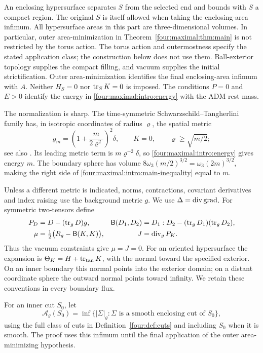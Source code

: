 An enclosing hypersurface separates \(S\) from the selected end and bounds
with \(S\) a compact region. The original \(S\) is itself allowed when
taking the enclosing-area infimum. All hypersurface areas in this part
are three-dimensional volumes. In particular, outer area-minimization in
Theorem~\ref{four:maximal:thm:main} is not restricted by the torus action.
The torus action and outermostness specify the stated application class;
the construction below does not use them.  Ball-exterior topology supplies
the compact filling, and vacuum supplies the initial strictification.
Outer area-minimization identifies the final enclosing-area infimum with
\(A\).  Neither \(H_S=0\) nor \(\operatorname{tr}_SK=0\) is imposed.  The conditions
\(P=0\) and \(E>0\) identify the energy in
\eqref{four:maximal:intro:energy} with the ADM rest mass.

The normalization is sharp. The time-symmetric Schwarzschild--Tangherlini
family \cite{Tangherlini1963} has, in isotropic coordinates of radius
\(\varrho\), the spatial metric
\[
 g_m=\left(1+\frac{m}{2\varrho^2}\right)^2\delta,
 \qquad K=0,
 \qquad \varrho\ge\sqrt{m/2};
\]
see also \cite[p.~83]{BrayLee2009}. Its leading metric term is
\(m\varrho^{-2}\delta\), so \eqref{four:maximal:intro:energy} gives energy \(m\).
The boundary sphere has volume
\(8\omega_3(m/2)^{3/2}=\omega_3(2m)^{3/2}\), making the right side of
\eqref{four:maximal:intro:main-inequality} equal to \(m\).


Unless a different metric is indicated, norms, contractions, covariant
derivatives and index raising use the background metric \(g\). We use
\(\Delta=\operatorname{div}\operatorname{grad}\). For symmetric two-tensors define
\begin{align}
 P_D&=D-(\operatorname{tr}_gD)g, &
 \mathsf{B}(D_1,D_2)&=D_1:D_2-(\operatorname{tr}_gD_1)(\operatorname{tr}_gD_2),\label{four:maximal:intro:bilinear}\\
 \mu&=\tfrac12\bigl(R_g-\mathsf{B}(K,K)\bigr), &
 J&=\operatorname{div}_gP_K.\label{four:maximal:intro:densities}
\end{align}
Thus the vacuum constraints give \(\mu=J=0\).
For an oriented hypersurface the expansion is
\(\Theta_K=H+\operatorname{tr}_{\mathrm{tan}}K\), with the normal toward the
specified exterior. On an inner boundary this normal points into the
exterior domain; on a distant coordinate sphere the outward normal points
toward infinity. We retain these conventions in every boundary flux.

For an inner cut \(S_0\), let
\[
 \mathcal A_g(S_0)=\inf\{|\Sigma|_g:
              \Sigma\text{ is a smooth enclosing cut of }S_0\},
\]
using the full class of cuts in Definition~\ref{four:def:cuts} and
including \(S_0\) when it is smooth. The proof uses this infimum until
the final application of the outer area-minimizing hypothesis.


